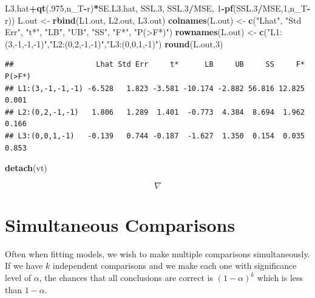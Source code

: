 \documentclass[
]{book}
\newenvironment{Shaded}{\begin{snugshade}}{\end{snugshade}}
\newcommand{\DecValTok}[1]{\textcolor[rgb]{0.00,0.00,0.81}{#1}}
\newcommand{\FloatTok}[1]{\textcolor[rgb]{0.00,0.00,0.81}{#1}}
\newcommand{\FunctionTok}[1]{\textcolor[rgb]{0.13,0.29,0.53}{\textbf{#1}}}
\newcommand{\NormalTok}[1]{#1}
\newcommand{\OtherTok}[1]{\textcolor[rgb]{0.56,0.35,0.01}{#1}}
\newcommand{\SpecialCharTok}[1]{\textcolor[rgb]{0.81,0.36,0.00}{\textbf{#1}}}
\newcommand{\StringTok}[1]{\textcolor[rgb]{0.31,0.60,0.02}{#1}}
\begin{document}
\begin{Shaded}
\begin{Highlighting}[]
\NormalTok{                L3.hat}\SpecialCharTok{+}\FunctionTok{qt}\NormalTok{(.}\DecValTok{975}\NormalTok{,n\_T}\SpecialCharTok{{-}}\NormalTok{r)}\SpecialCharTok{*}\NormalTok{SE.L3.hat,}
\NormalTok{                SSL}\FloatTok{.3}\NormalTok{, SSL}\FloatTok{.3}\SpecialCharTok{/}\NormalTok{MSE, }\DecValTok{1}\SpecialCharTok{{-}}\FunctionTok{pf}\NormalTok{(SSL}\FloatTok{.3}\SpecialCharTok{/}\NormalTok{MSE,}\DecValTok{1}\NormalTok{,n\_T}\SpecialCharTok{{-}}\NormalTok{r))}
\NormalTok{L.out }\OtherTok{\textless{}{-}} \FunctionTok{rbind}\NormalTok{(L1.out, L2.out, L3.out)}
\FunctionTok{colnames}\NormalTok{(L.out) }\OtherTok{\textless{}{-}} \FunctionTok{c}\NormalTok{(}\StringTok{"Lhat"}\NormalTok{, }\StringTok{"Std Err"}\NormalTok{, }\StringTok{"t*"}\NormalTok{, }\StringTok{"LB"}\NormalTok{, }\StringTok{"UB"}\NormalTok{, }\StringTok{"SS"}\NormalTok{, }\StringTok{"F*"}\NormalTok{, }\StringTok{"P(\textgreater{}F*)"}\NormalTok{)}
\FunctionTok{rownames}\NormalTok{(L.out) }\OtherTok{\textless{}{-}} \FunctionTok{c}\NormalTok{(}\StringTok{"L1:(3,{-}1,{-}1,{-}1)"}\NormalTok{,}\StringTok{"L2:(0,2,{-}1,{-}1)"}\NormalTok{,}\StringTok{"L3:(0,0,1,{-}1)"}\NormalTok{)}
\FunctionTok{round}\NormalTok{(L.out,}\DecValTok{3}\NormalTok{)}
\end{Highlighting}
\end{Shaded}

\begin{verbatim}
##                   Lhat Std Err     t*      LB     UB     SS     F* P(>F*)
## L1:(3,-1,-1,-1) -6.528   1.823 -3.581 -10.174 -2.882 56.816 12.825  0.001
## L2:(0,2,-1,-1)   1.806   1.289  1.401  -0.773  4.384  8.694  1.962  0.166
## L3:(0,0,1,-1)   -0.139   0.744 -0.187  -1.627  1.350  0.154  0.035  0.853
\end{verbatim}

\begin{Shaded}
\begin{Highlighting}[]
\FunctionTok{detach}\NormalTok{(vt)}
\end{Highlighting}
\end{Shaded}

\[\nabla\]

\section{Simultaneous Comparisons}\label{simultaneous-comparisons}

Often when fitting models, we wish to make multiple comparisons
simultaneously. If we have \(k\) independent comparisons and we make
each one with significance level of \(\alpha\), the chances that all
conclusions are correct is \((1-\alpha)^k\) which is less than
\(1-\alpha\).
\end{document}
